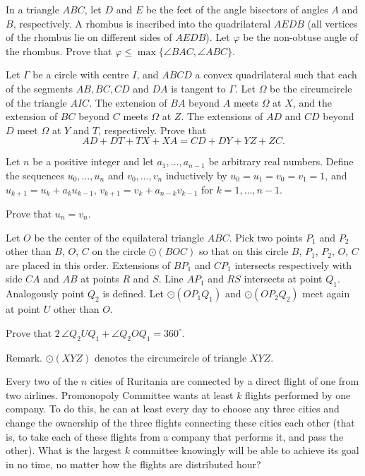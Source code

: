 \documentclass[11pt]{scrartcl}
\begin{document}
\begin{problem}[939535945446129]
In a triangle $ABC$, let $D$ and $E$ be the feet of the angle bisectors of angles $A$ and $B$, respectively. A rhombus is inscribed into the quadrilateral $AEDB$ (all vertices of the rhombus lie on different sides of $AEDB$). Let $\varphi$ be the non-obtuse angle of the rhombus. Prove that $\varphi \le \max \{  \angle BAC, \angle ABC  \}$.
\end{problem}
\begin{problem}[240654526717277]
Let $\Gamma$ be a circle with centre $I$, and $A B C D$ a convex quadrilateral such that each of the segments $A B, B C, C D$ and $D A$ is tangent to $\Gamma$. Let $\Omega$ be the circumcircle of the triangle $A I C$. The extension of $B A$ beyond $A$ meets $\Omega$ at $X$, and the extension of $B C$ beyond $C$ meets $\Omega$ at $Z$. The extensions of $A D$ and $C D$ beyond $D$ meet $\Omega$ at $Y$ and $T$, respectively. Prove that\[A D+D T+T X+X A=C D+D Y+Y Z+Z C.\]
\end{problem}
\begin{problem}[352746613208735]
	Let $n$ be a positive integer and let $a_1, \ldots, a_{n-1} $ be arbitrary real numbers. Define the sequences $u_0, \ldots, u_n $ and $v_0, \ldots, v_n $ inductively by $u_0 = u_1  = v_0 = v_1 = 1$, and $u_{k+1} = u_k + a_k u_{k-1}$, $v_{k+1} = v_k + a_{n-k} v_{k-1}$ for $k=1, \ldots, n-1.$

Prove that $u_n = v_n.$
\end{problem}
\begin{problem}[518384374486289]
	Let $O$ be the center of the equilateral triangle $ABC$. Pick two points $P_1$ and $P_2$ other than $B$, $O$, $C$ on the circle $\odot(BOC)$ so that on this circle $B$, $P_1$, $P_2$, $O$, $C$ are placed in this order. Extensions of $BP_1$ and $CP_1$ intersects respectively with side $CA$ and $AB$ at points $R$ and $S$. Line $AP_1$ and $RS$ intersects at point $Q_1$. Analogously point $Q_2$ is defined. Let $\odot(OP_1Q_1)$ and $\odot(OP_2Q_2)$ meet again at point $U$ other than $O$.

Prove that $2\,\angle Q_2UQ_1 + \angle Q_2OQ_1 = 360^\circ$.

Remark. $\odot(XYZ)$ denotes the circumcircle of triangle $XYZ$.
\end{problem}
\begin{problem}[231259391294064]
Every two of the $n$ cities of Ruritania are connected by a direct flight of one from two airlines. Promonopoly Committee wants at least $k$ flights performed by one company. To do this, he can at least every day to choose any three cities and change the ownership of the three flights connecting these cities each other (that is, to take each of these flights from a company that performs it, and pass the other). What is the largest $k$ committee knowingly will be able to achieve its goal in no time, no matter how the flights are distributed hour?
\end{problem}
\end{document}
